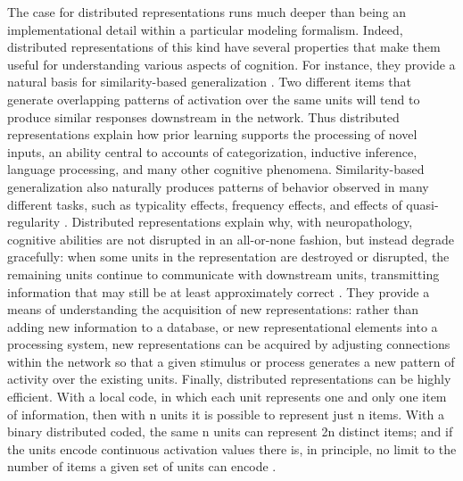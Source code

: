The case for distributed representations runs much deeper than being an implementational detail within a particular modeling formalism. Indeed, distributed representations of this kind have several properties that make them useful for understanding various aspects of cognition. For instance, they provide a natural basis for similarity-based generalization \cite{hinton_distributed_1984,RumelhartTodd93}. Two different items that generate overlapping patterns of activation over the same units will tend to produce similar responses downstream in the network. Thus distributed representations explain how prior learning supports the processing of novel inputs, an ability central to accounts of categorization, inductive inference, language processing, and many other cognitive phenomena. Similarity-based generalization also naturally produces patterns of behavior observed in many different tasks, such as typicality effects, frequency effects, and effects of quasi-regularity \cite{plaut_understanding_1996,rogers_semantic_2004}. Distributed representations explain why, with neuropathology, cognitive abilities are not disrupted in an all-or-none fashion, but instead degrade gracefully: when some units in the representation are destroyed or disrupted, the remaining units continue to communicate with downstream units, transmitting information that may still be at least approximately correct \cite{Allport85,cooper_shallice_2011}. They provide a means of understanding the acquisition of new representations: rather than adding new information to a database, or new representational elements into a processing system, new representations can be acquired by adjusting connections within the network so that a given stimulus or process generates a new pattern of activity over the existing units\cite{RumelhartTodd93}. Finally, distributed representations can be highly efficient. With a local code, in which each unit represents one and only one item of information, then with n units it is possible to represent just n items. With a binary distributed coded, the same n units can represent 2n distinct items; and if the units encode continuous activation values there is, in principle, no limit to the number of items a given set of units can encode \cite{hinton_distributed_1984}.


